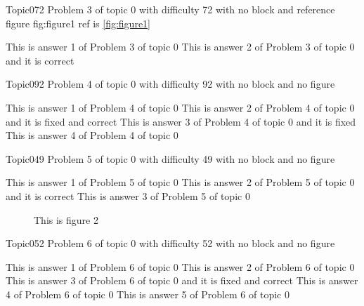 \documentclass[master]{exam}
\begin{document}
\begin{problem}{Topic0}{72}
	Problem 3 of topic 0 with difficulty 72 with no block and reference figure fig:figure1 ref is \ref{fig:figure1}
	\begin{answers}
		\answer This is answer 1 of Problem 3 of topic 0 
		\answer[correct] This is answer 2 of Problem 3 of topic 0 and it is correct
	\end{answers}
\end{problem}

\begin{problem}{Topic0}{92}
	Problem 4 of topic 0 with difficulty 92 with no block and no figure
	\begin{answers}
		\answer This is answer 1 of Problem 4 of topic 0 
		 This is answer 2 of Problem 4 of topic 0 and it is fixed and correct
		\answer[fixed] This is answer 3 of Problem 4 of topic 0 and it is fixed
		\answer This is answer 4 of Problem 4 of topic 0 
	\end{answers}
\end{problem}

\begin{problem}{Topic0}{49}
	Problem 5 of topic 0 with difficulty 49 with no block and no figure
	\begin{answers}
		\answer This is answer 1 of Problem 5 of topic 0 
		\answer[correct] This is answer 2 of Problem 5 of topic 0 and it is correct
		\answer This is answer 3 of Problem 5 of topic 0 
	\end{answers}
\end{problem}



\begin{figure}
	\begin{center}
		This is figure 2 
		\label{fig:figure2}
	\end{center}
\end{figure}

\begin{problem}{Topic0}{52}
	Problem 6 of topic 0 with difficulty 52 with no block and no figure
	\begin{answers}
		\answer This is answer 1 of Problem 6 of topic 0 
		\answer This is answer 2 of Problem 6 of topic 0 
		 This is answer 3 of Problem 6 of topic 0 and it is fixed and correct
		\answer This is answer 4 of Problem 6 of topic 0 
		\answer This is answer 5 of Problem 6 of topic 0 
	\end{answers}
\end{problem}
\end{document}
